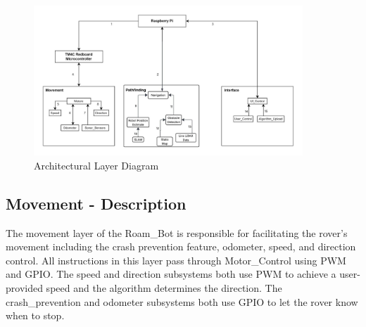 
\begin{figure}[h!]
	\centering
 	\includegraphics[width=0.90\textwidth]{images/data_flow_2nd.jpeg}
 \caption{Architectural Layer Diagram} %
\end{figure}

\subsection{Movement - Description}
The movement layer of the Roam\_Bot is responsible for facilitating the rover's movement including the crash prevention feature, odometer, speed, and direction control. All instructions in this layer pass through Motor\_Control using PWM and GPIO. The speed and direction subsystems both use PWM to achieve a user-provided speed and the algorithm determines the direction. The crash\_prevention and odometer subsystems both use GPIO to let the rover know when to stop.

